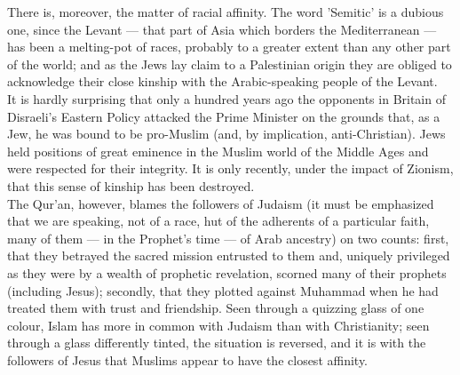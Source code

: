 \documentclass[10pt, twoside,openright]{book}
\begin{document}
There is, moreover, the matter of racial affinity. The word 'Semitic' is a dubious one, since the 
Levant --- that part of Asia which borders the Mediterranean --- has been a melting\hyp{}pot of races, 
probably to a greater extent than any other part of the world; and as the Jews lay claim to a 
Palestinian origin they are obliged to acknowledge their close kinship with the Arabic\hyp{}speaking 
people of the Levant. \\

It is hardly surprising that only a hundred years ago the opponents in Britain of Disraeli's Eastern 
Policy attacked the Prime Minister on the grounds that, as a Jew, he was bound to be pro\hyp{}Muslim (and, 
by implication, anti\hyp{}Christian). Jews held positions of great eminence in the Muslim world of the 
Middle Ages and were respected for their integrity. It is only recently, under the impact of Zionism, 
that this sense of kinship has been destroyed. \\

The Qur'an, however, blames the followers of Judaism (it must be emphasized that we are speaking, not 
of a race, hut of the adherents of a particular faith, many of them --- in the Prophet's time --- of Arab 
ancestry) on two counts: first, that they betrayed the sacred mission entrusted to them and, uniquely 
privileged as they were by a wealth of prophetic revelation, scorned many of their prophets 
(including Jesus); secondly, that they plotted against Muhammad when he had treated them with trust 
and friendship. Seen through a quizzing glass of one colour, Islam has more in common with Judaism 
than with Christianity; seen through a glass differently tinted, the situation is reversed, and it is 
with the followers of Jesus that Muslims appear to have the closest affinity. \\
\end{document}
